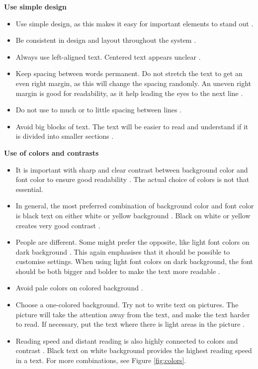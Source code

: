 \textbf{Use simple design}
\begin{itemize} 
\item Use simple design, as this makes it easy for important elements to stand out \cite{actionforblindpeopleTekst}.
\item Be consistent in design and layout throughout the system \cite{actionforblindpeopleTekst}.
\item Always use left-aligned text. Centered text appears unclear \cite{actionforblindpeopleTekst}.  
\item Keep spacing between words permanent. Do not stretch the text to get an even right margin, as this will change the spacing randomly. An uneven right margin is good for readability, as it help leading the eyes to the next line \cite{blindeforbundetTekst} \cite{actionforblindpeopleTekst}.
\item Do not use to much or to little spacing between lines \cite{blindeforbundetTekst} \cite{actionforblindpeopleTekst}. 
\item Avoid big blocks of text. The text will be easier to read and understand if it is divided into smaller sections \cite{blindeforbundetTekst} \cite{actionforblindpeopleTekst} \cite{evengrounds}. \\  
\end{itemize}

\textbf{Use of colors and contrasts}
\begin{itemize} 
\item It is important with sharp and clear contrast between background color and font color to ensure good readability \cite{blindeforbundetTekst} \cite{actionforblindpeopleTekst}. The actual choice of colors is not that essential.   
\item In general, the most preferred combination of background color and font color is black text on either white or yellow background \cite{actionforblindpeopleTekst}. Black on white or yellow creates very good contrast \cite{blindeforbundetTekst}. 
\item People are different. Some might prefer the opposite, like light font colors on dark background \cite{blindeforbundetTekst}. This again emphasises that it should be possible to customise settings. When using light font colors on dark background, the font should be both bigger and bolder to make the text more readable \cite{actionforblindpeopleTekst}.
\item Avoid pale colors on colored background \cite{blindeforbundetTekst}.  
\item Choose a one-colored background. Try not to write text on pictures. The picture will take the attention away from the text, and make the text harder to read. If necessary, put the text where there is light areas in the picture  \cite{blindeforbundetTekst}.  
\item Reading speed and distant reading is also highly connected to colors and contrast  \cite{blindeforbundetTekst}. Black text on white background provides the highest reading speed in a text. For more combinations, see Figure \ref{fig:colors}.
\end{itemize}

